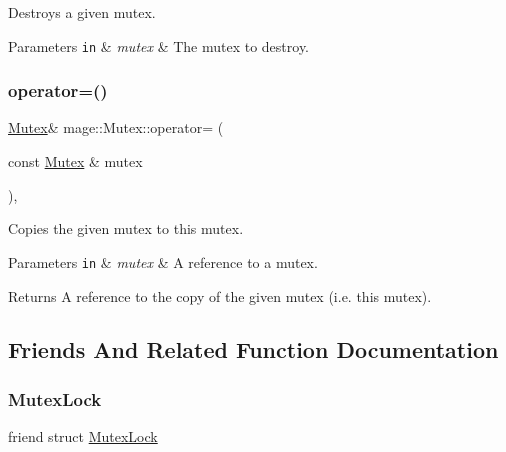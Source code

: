 Destroys a given mutex.


\begin{DoxyParams}[1]{Parameters}
\mbox{\tt in}  & {\em mutex} & The mutex to destroy. \\
\hline
\end{DoxyParams}
\hypertarget{classmage_1_1_mutex_a56072bdabdeadd5d897de232dbd298a0}{}\label{classmage_1_1_mutex_a56072bdabdeadd5d897de232dbd298a0} 
\subsubsection{\texorpdfstring{operator=()}{operator=()}}
{\footnotesize\ttfamily \hyperlink{classmage_1_1_mutex}{Mutex}\& mage\+::\+Mutex\+::operator= (\begin{DoxyParamCaption}\item[{const \hyperlink{classmage_1_1_mutex}{Mutex} \&}]{mutex }\end{DoxyParamCaption})\hspace{0.3cm}{\ttfamily [private]}, {\ttfamily [delete]}}

Copies the given mutex to this mutex.


\begin{DoxyParams}[1]{Parameters}
\mbox{\tt in}  & {\em mutex} & A reference to a mutex. \\
\hline
\end{DoxyParams}
\begin{DoxyReturn}{Returns}
A reference to the copy of the given mutex (i.\+e. this mutex). 
\end{DoxyReturn}


\subsection{Friends And Related Function Documentation}
\hypertarget{classmage_1_1_mutex_a058473d070063e5098732f355f432bd9}{}\label{classmage_1_1_mutex_a058473d070063e5098732f355f432bd9} 
\subsubsection{\texorpdfstring{Mutex\+Lock}{MutexLock}}
{\footnotesize\ttfamily friend struct \hyperlink{structmage_1_1_mutex_lock}{Mutex\+Lock}\hspace{0.3cm}{\ttfamily [friend]}}



